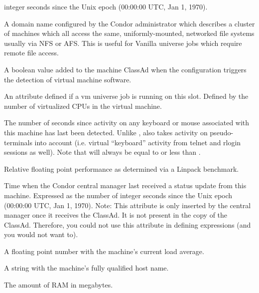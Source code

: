 \begin{description}
integer seconds since the Unix epoch (00:00:00 UTC, Jan 1, 1970).
%
\item[\AdAttr{FileSystemDomain}:] A domain name configured by the
Condor administrator which describes a cluster of machines which all
access the same, uniformly-mounted, networked file systems usually via
NFS or AFS.  This is useful for Vanilla universe jobs which require
remote file access.
%
\item[\AdAttr{HasVM}:] A boolean value added to the machine ClassAd
when the configuration triggers the detection of virtual machine
software.
%
\item[\AdAttr{JobVM\_VCPUS}:] An attribute defined if a vm universe job
is running on this slot.  Defined by the number of virtualized CPUs
in the virtual machine.
%
\item[\AdAttr{KeyboardIdle}:] The number of seconds since activity on any
keyboard or mouse associated with this machine has last been detected.
Unlike ,  also takes activity 
on pseudo-terminals into
account (i.e. virtual ``keyboard'' activity from telnet and rlogin
sessions as well).  Note that  will always be equal to or
less than .
%
\item[\AdAttr{KFlops}:] Relative floating point performance as determined via a
Linpack benchmark.
%
\item[\AdAttr{LastHeardFrom}:] Time when the Condor central manager last
received a status update from this machine.  
Expressed as 
the number of integer seconds since the Unix epoch (00:00:00 UTC, Jan 1, 1970).
Note: This attribute is only inserted by the central manager once it
receives the ClassAd.
It is not present in the  copy of the ClassAd.
Therefore, you could not use this attribute in defining 
expressions (and you would not want to).
%
\item[\AdAttr{LoadAvg}:] A floating point number with the machine's current load
average.
%
\item[\AdAttr{Machine}:] A string with the machine's fully qualified host name.
%
\item[\AdAttr{Memory}:] The amount of RAM in megabytes.

\end{description}
